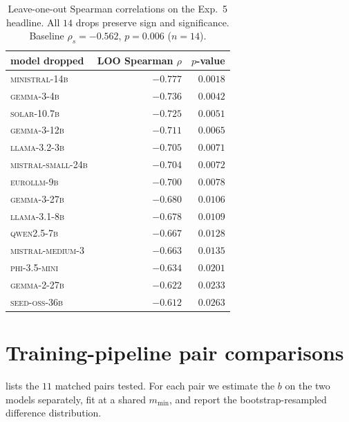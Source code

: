 \documentclass{article}
\newcommand{\sdi}{\ensuremath{b}}
\begin{document}
\begin{table}[h]
\centering
\small
\begin{tabular}{l r r}
\toprule
model dropped & LOO Spearman $\rho$ & $p$-value \\
\midrule
\textsc{ministral-14b}           & $-0.777$ & $0.0018$ \\
\textsc{gemma-3-4b}              & $-0.736$ & $0.0042$ \\
\textsc{solar-10.7b}             & $-0.725$ & $0.0051$ \\
\textsc{gemma-3-12b}             & $-0.711$ & $0.0065$ \\
\textsc{llama-3.2-3b}   & $-0.705$ & $0.0071$ \\
\textsc{mistral-small-24b}       & $-0.704$ & $0.0072$ \\
\textsc{eurollm-9b}              & $-0.700$ & $0.0078$ \\
\textsc{gemma-3-27b}             & $-0.680$ & $0.0106$ \\
\textsc{llama-3.1-8b}   & $-0.678$ & $0.0109$ \\
\textsc{qwen2.5-7b}              & $-0.667$ & $0.0128$ \\
\textsc{mistral-medium-3}        & $-0.663$ & $0.0135$ \\
\textsc{phi-3.5-mini}            & $-0.634$ & $0.0201$ \\
\textsc{gemma-2-27b}             & $-0.622$ & $0.0233$ \\
\textsc{seed-oss-36b}            & $-0.612$ & $0.0263$ \\
\bottomrule
\end{tabular}
\caption{Leave-one-out Spearman correlations on the Exp.~5 headline.
All $14$ drops preserve sign and significance. Baseline
$\rho_s = -0.562$, $p = 0.006$ ($n = 14$).}\label{tab:loo}
\end{table}

\section{Training-pipeline pair comparisons}\label{app:pairs}

 lists the $11$ matched pairs tested. For each pair
we estimate the \sdi{} on the two models separately, fit at a
shared $m_{\min}$, and report the bootstrap-resampled difference
distribution.
\end{document}
